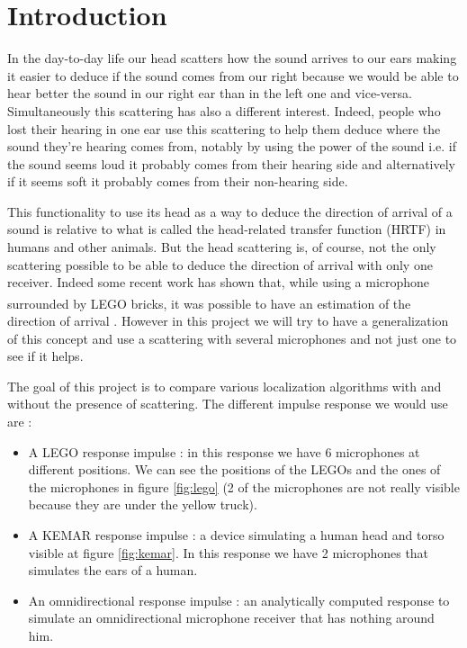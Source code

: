\section{Introduction}

In the day-to-day life our head scatters how the sound arrives to our ears making it easier to deduce if the sound comes from our right because we would be able to hear better the sound in our right ear than in the left one and vice-versa. Simultaneously this scattering has also a different interest. Indeed, people who lost their hearing in one ear use this scattering to help them deduce where the sound they're hearing comes from, notably by using the power of the sound i.e. if the sound seems loud it probably comes from their hearing side and alternatively if it seems soft it probably comes from their non-hearing side.

This functionality to use its head as a way to deduce the direction of arrival of a sound is relative to what is called the head-related transfer function (HRTF) in humans and other animals. But the head scattering is, of course, not the only scattering possible to be able to deduce the direction of arrival with only one receiver. Indeed some recent work has shown that, while using a microphone surrounded by LEGO\textsuperscript{\textcopyright} bricks, it was possible to have an estimation of the direction of arrival \cite{dalia}. However in this project we will try to have a generalization of this concept and use a scattering with several microphones and not just one to see if it helps.

The goal of this project is to compare various localization algorithms with and without the presence of scattering. The different impulse response we would use are :
\begin{itemize}
    \item A LEGO response impulse : in this response we have 6 microphones at different positions. We can see the positions of the LEGOs and the ones of the microphones in figure \ref{fig:lego} (2 of the microphones are not really visible because they are under the yellow truck).
    \item A KEMAR response impulse : a device simulating a human head and torso visible at figure \ref{fig:kemar}. In this response we have 2 microphones that simulates the ears of a human.
    \item An omnidirectional response impulse : an analytically computed response to simulate an omnidirectional microphone receiver that has nothing around him.
\end{itemize}

